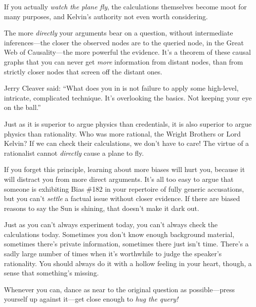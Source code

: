 {
 If you actually \textit{watch the plane fly}, the calculations
themselves become moot for many purposes, and Kelvin's
authority not even worth considering.}

{
 The more \textit{directly} your arguments bear on a question,
without intermediate inferences---the closer the observed nodes are to
the queried node, in the Great Web of Causality---the more powerful the
evidence. It's a theorem of these causal graphs that
you can never get \textit{more} information from distant nodes, than
from strictly closer nodes that screen off the distant ones.}

{
 Jerry Cleaver said: ``What does you in is not
failure to apply some high-level, intricate, complicated technique.
It's overlooking the basics. Not keeping your eye on
the ball.''}

{
 Just as it is superior to argue physics than credentials, it is
also superior to argue physics than rationality. Who was more rational,
the Wright Brothers or Lord Kelvin? If we can check their calculations,
we don't have to care! The virtue of a rationalist
cannot \textit{directly} cause a plane to fly.}

{
 If you forget this principle, learning about more biases will hurt
you, because it will distract you from more direct arguments.
It's all too easy to argue that someone is exhibiting
Bias \#182 in your repertoire of fully generic accusations, but you
can't \textit{settle} a factual issue without closer
evidence. If there are biased reasons to say the Sun is shining, that
doesn't make it dark out.}

{
 Just as you can't always experiment today, you
can't always check the calculations today. Sometimes
you don't know enough background material, sometimes
there's private information, sometimes there just
isn't time. There's a sadly large
number of times when it's worthwhile to judge the
speaker's rationality. You should always do it with a
hollow feeling in your heart, though, a sense that
something's missing.}

{
 Whenever you can, dance as near to the original question as
possible---press yourself up against it---get close enough to
\textit{hug the query!}}

\myendsectiontext


\bigskip


